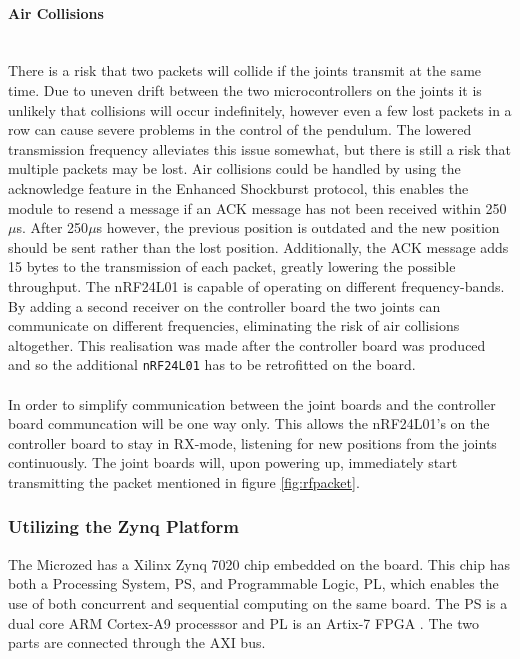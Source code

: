 \paragraph{Air Collisions}~\\
\label{par:air_collisions}
There is a risk that two packets will collide if the joints transmit at the same time.
Due to uneven drift between the two microcontrollers on the joints it is unlikely that collisions will occur indefinitely, however even a few lost packets in a row can cause severe problems in the control of the pendulum.
The lowered transmission frequency alleviates this issue somewhat, but there is still a risk that multiple packets may be lost.
Air collisions could be handled by using the acknowledge feature in the Enhanced Shockburst protocol, this enables the module to resend a message if an ACK message has not been received within 250$\mu$s.
After 250$\mu$s however, the previous position is outdated and the new position should be sent rather than the lost position.
Additionally, the ACK message adds 15 bytes to the transmission of each packet, greatly lowering the possible throughput.
The nRF24L01 is capable of operating on different frequency-bands.
By adding a second receiver on the controller board the two joints can communicate on different frequencies, eliminating the risk of air collisions altogether.
This realisation was made after the controller board was produced and so the additional \texttt{nRF24L01} has to be retrofitted on the board. 
\\~\\
In order to simplify communication between the joint boards and the controller board communcation will be one way only.
This allows the nRF24L01's on the controller board to stay in RX-mode, listening for new positions from the joints continuously.
The joint boards will, upon powering up, immediately start transmitting the packet mentioned in figure \ref{fig:rfpacket}.

\subsubsection{Utilizing the Zynq Platform} %
\label{ssub:utializing_the_zynq_platform}
The Microzed has a Xilinx Zynq 7020 chip embedded on the board. 
This chip has both a Processing System, PS, and Programmable Logic, PL, which enables the use of both concurrent and sequential computing on the same board. 
The PS is a dual core ARM Cortex-A9 processsor and PL is an Artix-7 FPGA \cite{zynq_data_sheet}.
The two parts are connected through the AXI bus.

